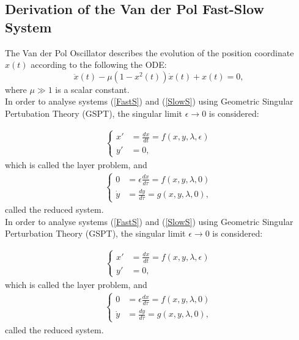 \subsection{Derivation of the Van der Pol Fast-Slow System}

The Van der Pol Oscillator describes the evolution of the position coordinate \(x(t)\) according to the following the ODE:
\begin{equation} \label{eq:vdP}
\ddot{x}(t)-\mu\left(1-x^2(t)\right)\dot{x}(t)+x(t)=0,
\end{equation}
where \(\mu \gg 1\) is a scalar constant. \\

In order to analyse systems (\ref{FastS}) and (\ref{SlowS}) using Geometric Singular Pertubation Theory (GSPT), the singular limit $\epsilon \to 0$ is considered:

\begin{align} \label{FastS0}
\begin{cases}
x' &=\frac{dx}{dt}= f(x,y,\lambda, \epsilon)\\
y' &= 0,
\end{cases}
\end{align}
which is called the layer problem, and
\begin{align}\label{SlowS0}
\begin{cases}
0 &= \epsilon \frac{dx}{d \tau} = f(x,y,\lambda, 0)\\
\dot{y} & = \frac{dy}{d \tau} =  g( x,y, \lambda,0),
\end{cases}
\end{align}
called the reduced system.\\


In order to analyse systems (\ref{FastS}) and (\ref{SlowS}) using Geometric Singular Perturbation Theory (GSPT), the singular limit $\epsilon \to 0$ is considered:

\begin{align} \label{FastS0}
\begin{cases}
x' &=\frac{dx}{dt}= f(x,y,\lambda, \epsilon)\\
y' &= 0,
\end{cases}
\end{align}
which is called the layer problem, and
\begin{align}\label{SlowS0}
\begin{cases}
0 &= \epsilon \frac{dx}{d \tau} = f(x,y,\lambda, 0)\\
\dot{y} & = \frac{dy}{d \tau} =  g( x,y, \lambda,0),
\end{cases}
\end{align}
called the reduced system.\\

